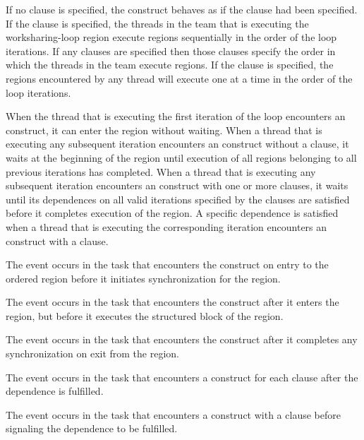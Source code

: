 \descr
If no clause is specified, the  construct behaves as if the
 clause had been specified. If the  clause is
specified, the threads in the team that is executing the worksharing-loop 
region execute  regions sequentially in the order of the loop 
iterations. If any  clauses are specified then those clauses 
specify the order in which the threads in the team execute  
regions. If the  clause is specified, the  regions 
encountered by any thread will execute one at a time in the order of the 
loop iterations.

When the thread that is executing the first iteration of the loop encounters an
 construct, it can enter the  region without
waiting. When a thread that is executing any subsequent iteration encounters an
 construct without a  clause, it waits at the
beginning of the  region until execution of all 
regions belonging to all previous iterations has completed. When a thread that
is executing any subsequent iteration encounters an  construct with
one or more {} clauses, it waits until its dependences 
on all valid iterations specified by the  clauses are satisfied before 
it completes execution of the  region. A specific dependence is 
satisfied when a thread that is executing the corresponding iteration encounters 
an  construct with a  clause.

\events

The  event occurs in the task that encounters the
 construct on entry to the ordered region before it initiates 
synchronization for the region.

The  event occurs in the task that encounters the
 construct after it enters the region, but before it executes the
structured block of the  region.

The  event occurs in the task that encounters the
 construct after it completes any synchronization on exit 
from the  region.

The  event occurs in the task that encounters a
 construct for each {}
clause after the dependence is fulfilled.

The  event occurs in the task that encounters a
 construct with a {} 
clause before signaling the dependence to be fulfilled.

